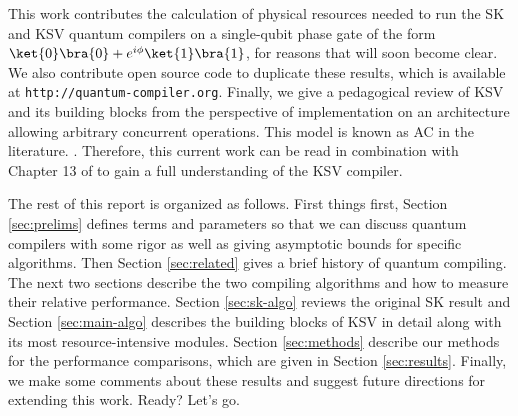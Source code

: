 This work contributes the calculation of physical resources needed
to run the SK and KSV quantum compilers on a single-qubit phase gate
of the form $\ket{0}\bra{0} + e^{i\phi}\ket{1}\bra{1}$, for reasons that
will soon become clear. We also contribute open source code to duplicate
these results, which is available at \texttt{http://quantum-compiler.org}.
Finally, we give a pedagogical review of KSV and its building blocks from the
perspective of implementation on an architecture allowing arbitrary concurrent
operations. This model is known as \textsc{AC} in the literature.
\cite{VanMeter2008}. Therefore, this current work can be read in combination
with Chapter 13 of \cite{ksv02} to gain a full understanding of the KSV
compiler.

The rest of this report is organized as follows.
First things first, Section \ref{sec:prelims} defines terms and parameters
so that we can discuss quantum compilers with some rigor as well as
giving asymptotic bounds for specific algorithms.
Then Section
\ref{sec:related} gives a brief history of quantum compiling.
The next two sections describe the two compiling algorithms and how
to measure their relative performance.
Section \ref{sec:sk-algo} reviews the original SK result and
Section \ref{sec:main-algo} describes the building blocks of KSV in detail
along with its
most resource-intensive modules. Section \ref{sec:methods} describe
our methods for the performance comparisons, which are given in Section
\ref{sec:results}. Finally, we make some comments about these results
and suggest future directions for extending this work. Ready? Let's go.